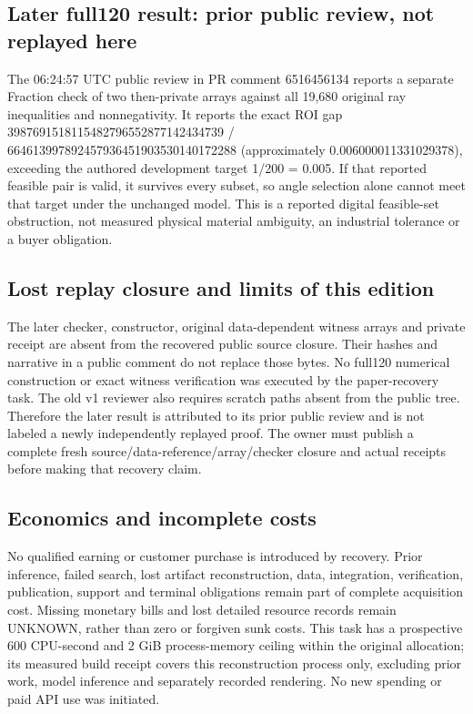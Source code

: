 \documentclass[11pt,letterpaper]{article}
\begin{document}
\subsection*{Later full120 result: prior public review, not replayed here}
The 06:24:57 UTC public review in PR comment 6516456134 reports a separate Fraction check of two then-private arrays against all 19,680 original ray inequalities and nonnegativity. It reports the exact ROI gap 3987691518115482796552877142434739 / 664613997892457936451903530140172288 (approximately 0.006000011331029378), exceeding the authored development target 1/200 = 0.005. If that reported feasible pair is valid, it survives every subset, so angle selection alone cannot meet that target under the unchanged model. This is a reported digital feasible-set obstruction, not measured physical material ambiguity, an industrial tolerance or a buyer obligation.\par
\subsection*{Lost replay closure and limits of this edition}
The later checker, constructor, original data-dependent witness arrays and private receipt are absent from the recovered public source closure. Their hashes and narrative in a public comment do not replace those bytes. No full120 numerical construction or exact witness verification was executed by the paper-recovery task. The old v1 reviewer also requires scratch paths absent from the public tree. Therefore the later result is attributed to its prior public review and is not labeled a newly independently replayed proof. The owner must publish a complete fresh source/data-reference/array/checker closure and actual receipts before making that recovery claim.\par
\subsection*{Economics and incomplete costs}
No qualified earning or customer purchase is introduced by recovery. Prior inference, failed search, lost artifact reconstruction, data, integration, verification, publication, support and terminal obligations remain part of complete acquisition cost. Missing monetary bills and lost detailed resource records remain UNKNOWN, rather than zero or forgiven sunk costs. This task has a prospective 600 CPU-second and 2 GiB process-memory ceiling within the original allocation; its measured build receipt covers this reconstruction process only, excluding prior work, model inference and separately recorded rendering. No new spending or paid API use was initiated.\par
\end{document}
